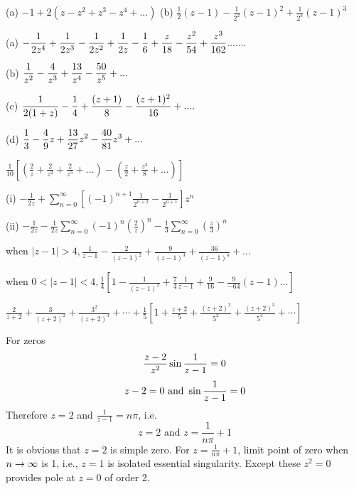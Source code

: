 \begin{Solution}{3.6}
(a) $-1+2(z-z^{2}+z^{3}-z^{4}+...)$
\noindent
(b) $\frac{1}{2}(z-1)-\frac{1}{2^{2}}(z-1)^{2}+\frac{1}{2^{3}}(z-1)^{3}$
\end{Solution}
\begin{Solution}{3.7}
(a) $\displaystyle -\frac{1}{2z^{4}}+\frac{1}{2z^{3}}-\frac{1}{2z^{2}}+\frac{1}{2z}-\frac{1}{6}+\frac{z}{18}-\frac{z^{2}}{54}+\frac{z^{3}}{162}.......$

(b) $\displaystyle \frac{1}{z^{2}}-\frac{4}{z^{3}}+\frac{13}{z^{4}}-\frac{50}{z^{5}}+...$

(c) $\displaystyle \frac{1}{2(1+z)}-\frac{1}{4}+\frac{(z+1)}{8}-\frac{(z+1)^{2}}{16}+....$

(d) $\displaystyle \frac{1}{3}-\frac{4}{9}z+\frac{13}{27}z^{2}-\frac{40}{81}z^{3}+...$
\end{Solution}
\begin{Solution}{3.9}
$\frac{1}{10}[(\frac{2}{z}+\frac{2}{z^{2}}+\frac{2}{z^{5}}+...)-(\frac{z}{2}+\frac{z^{3}}{8}+...)]$
\end{Solution}
\begin{Solution}{3.10}
(i) $-\frac{1}{2z}+\sum_{n=0}^{\infty}\left[(-1)^{n+1}\frac{1}{2^{n+2}}-\frac{1}{2^{n+1}}\right]z^{n}$

(ii) $-\frac{1}{2z}-\frac{1}{2z}\sum_{n=0}^{\infty}(-1)^{n}(\frac{2}{z})^{n}-\frac{1}{3}\sum_{n=0}^{\infty}(\frac{z}{3})^{n}$

\end{Solution}
\begin{Solution}{3.11}
when $|z-1|>4,\frac{1}{z-1}-\frac{2}{(z-1)^{2}}+\frac{9}{(z-1)^{3}}+\frac{36}{(z-1)^{4}}+...$

when $0<|z-1|<4,\frac{1}{4}[1-\frac{1}{(z-1)^{2}}+\frac{7}{4}\frac{1}{z-1}+\frac{9}{16}-\frac{9}{-64}(z-1)...]$
\end{Solution}
\begin{Solution}{3.13}
$\frac{2}{z+2}+\frac{3}{(z+2)^{2}}+\frac{3^{2}}{(z+2)^{3}}+\cdots+\frac{1}{5}\left[1+\frac{z+2}{5}+\frac{(z+2)^{2}}{5^{2}}+\frac{(z+2)^{3}}{5^{3}}+\cdots\right]$
\end{Solution}
\begin{Solution}{4.1}
	For zeros
	\[\frac{z-2}{z^2}\sin{1 \over z-1} = 0\]
	\[z-2 = 0 \text{ and } \sin{1 \over z-1} = 0\]
	Therefore $z=2$ and $\frac{1}{z-1}=n\pi$, i.e.
	\[z= 2 \text{ and } z=\frac{1}{n\pi}+1\]
	It is obvious that $z=2$ is simple zero. For $z=\frac{1}{n\pi}+1$, limit point of zero when $n\rightarrow \infty$ is 1, i.e., $z=1$ is isolated essential singularity. Except these $z^2=0$ provides pole at $z=0$ of order 2.
	
\end{Solution}

